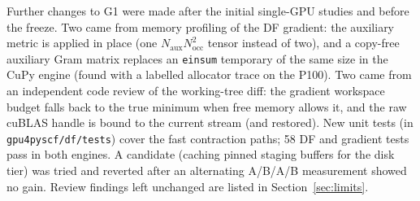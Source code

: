 Further changes to G1 were made after the initial single-GPU studies and before the freeze. Two came from memory profiling of the DF gradient: the auxiliary metric is applied in place (one $N_\mathrm{aux}N_\mathrm{occ}^2$ tensor instead of two), and a copy-free auxiliary Gram matrix replaces an \texttt{einsum} temporary of the same size in the CuPy engine (found with a labelled allocator trace on the P100). Two came from an independent code review of the working-tree diff: the gradient workspace budget falls back to the true minimum when free memory allows it, and the raw cuBLAS handle is bound to the current stream (and restored). New unit tests (in \texttt{gpu4pyscf/df/tests}) cover the fast contraction paths; 58 DF and gradient tests pass in both engines. A candidate (caching pinned staging buffers for the disk tier) was tried and reverted after an alternating A/B/A/B measurement showed no gain. Review findings left unchanged are listed in Section~\ref{sec:limits}.
